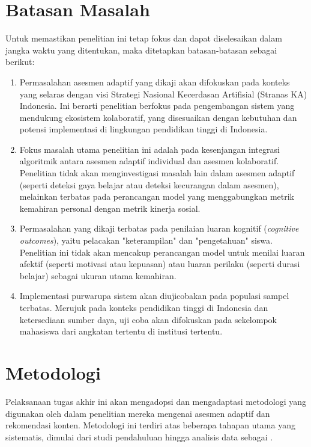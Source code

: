 \section{Batasan Masalah}
\label{sec:batasan_masalah}
Untuk memastikan penelitian ini tetap fokus dan dapat diselesaikan dalam jangka waktu yang ditentukan, maka ditetapkan batasan-batasan sebagai berikut:
\begin{enumerate}
  \item Permasalahan asesmen adaptif yang
  dikaji akan difokuskan pada konteks yang selaras dengan visi Strategi Nasional
  Kecerdasan Artifisial (Stranas KA) Indonesia. Ini berarti penelitian berfokus
  pada pengembangan sistem yang mendukung ekosistem kolaboratif, yang disesuaikan
  dengan kebutuhan dan potensi implementasi di lingkungan pendidikan tinggi di
  Indonesia.
  \item Fokus masalah utama penelitian ini adalah pada kesenjangan integrasi
  algoritmik antara asesmen adaptif individual dan asesmen kolaboratif. Penelitian
  tidak akan menginvestigasi masalah lain dalam asesmen adaptif (seperti deteksi
  gaya belajar atau deteksi kecurangan dalam asesmen), melainkan terbatas pada
  perancangan model yang menggabungkan metrik kemahiran personal dengan metrik
  kinerja sosial.
  \item Permasalahan yang dikaji terbatas pada penilaian luaran kognitif
  (\textit{cognitive outcomes}), yaitu pelacakan "keterampilan" dan "pengetahuan"
  siswa. Penelitian ini tidak akan mencakup perancangan model untuk menilai luaran
  afektif (seperti motivasi atau kepuasan) atau luaran perilaku (seperti durasi
  belajar) sebagai ukuran utama kemahiran.
  \item Implementasi purwarupa sistem akan diujicobakan pada populasi sampel terbatas.
  Merujuk pada konteks pendidikan tinggi di Indonesia dan ketersediaan sumber daya,
  uji coba akan difokuskan pada sekelompok mahasiswa dari angkatan tertentu
  di institusi tertentu.
\end{enumerate}

\section{Metodologi}

Pelaksanaan tugas akhir ini akan mengadopsi dan mengadaptasi metodologi yang digunakan oleh \textcite{Vesin2022} dalam penelitian mereka mengenai asesmen adaptif dan rekomendasi konten. Metodologi ini terdiri atas beberapa tahapan utama yang sistematis, dimulai dari studi pendahuluan hingga analisis data sebagai .

